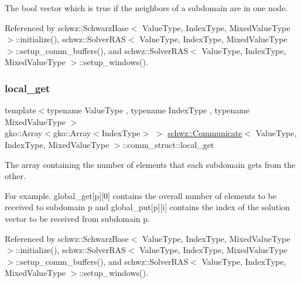 The bool vector which is true if the neighbors of a subdomain are in one node. 



Referenced by schwz\+::\+Schwarz\+Base$<$ Value\+Type, Index\+Type, Mixed\+Value\+Type $>$\+::initialize(), schwz\+::\+Solver\+R\+A\+S$<$ Value\+Type, Index\+Type, Mixed\+Value\+Type $>$\+::setup\+\_\+comm\+\_\+buffers(), and schwz\+::\+Solver\+R\+A\+S$<$ Value\+Type, Index\+Type, Mixed\+Value\+Type $>$\+::setup\+\_\+windows().

\mbox{\label{structschwz_1_1Communicate_1_1comm__struct_a645056881f547c1ada09a37c9d94df38}} 
\subsubsection{\texorpdfstring{local\+\_\+get}{local\_get}}
{\footnotesize\ttfamily template$<$typename Value\+Type , typename Index\+Type , typename Mixed\+Value\+Type $>$ \\
gko\+::\+Array$<$gko\+::\+Array$<$Index\+Type$>$ $>$ \hyperlink{classschwz_1_1Communicate}{schwz\+::\+Communicate}$<$ Value\+Type, Index\+Type, Mixed\+Value\+Type $>$\+::comm\+\_\+struct\+::local\+\_\+get}



The array containing the number of elements that each subdomain gets from the other. 

For example. global\+\_\+get\mbox{[}p\mbox{]}\mbox{[}0\mbox{]} contains the overall number of elements to be received to subdomain p and global\+\_\+put\mbox{[}p\mbox{]}\mbox{[}i\mbox{]} contains the index of the solution vector to be received from subdomain p. 

Referenced by schwz\+::\+Schwarz\+Base$<$ Value\+Type, Index\+Type, Mixed\+Value\+Type $>$\+::initialize(), schwz\+::\+Solver\+R\+A\+S$<$ Value\+Type, Index\+Type, Mixed\+Value\+Type $>$\+::setup\+\_\+comm\+\_\+buffers(), and schwz\+::\+Solver\+R\+A\+S$<$ Value\+Type, Index\+Type, Mixed\+Value\+Type $>$\+::setup\+\_\+windows().

\mbox{\label{structschwz_1_1Communicate_1_1comm__struct_a24320ef129e2070deaa936f33f3076e0}} 
